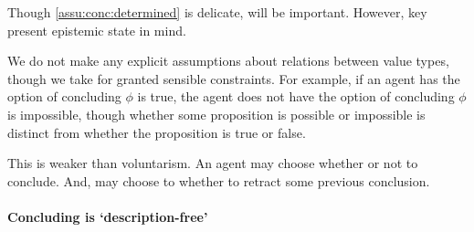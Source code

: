 \begin{note}
  Though \autoref{assu:conc:determined} is delicate, will be important.
  However, key present epistemic state in mind.
\end{note}

\begin{note}
  We do not make any explicit assumptions about relations between value types, though we take for granted sensible constraints.
  For example, if an agent has the option of concluding \(\phi\) is true, the agent does not have the option of concluding \(\phi\) is impossible, though whether some proposition is possible or impossible is distinct from whether the proposition is true or false.
\end{note}

\begin{note}
  This is weaker than voluntarism.
  An agent may choose whether or not to conclude.
  And, may choose to whether to retract some previous conclusion.
\end{note}

\paragraph*{Concluding is `description-free'}

